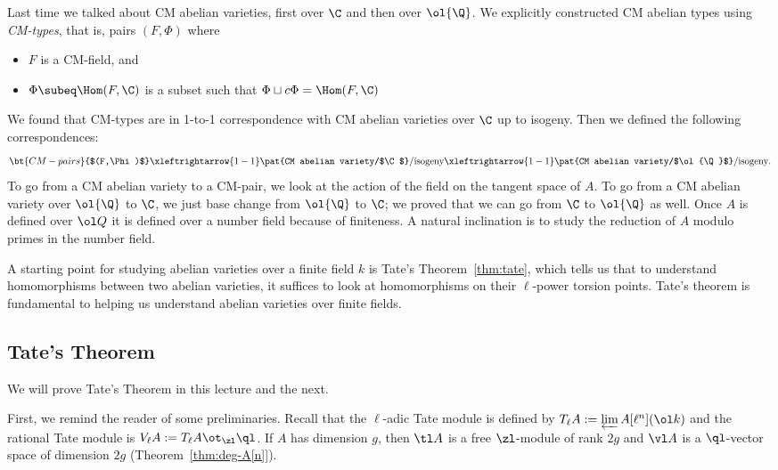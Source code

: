 
Last time we talked about CM abelian varieties, first over $\C$ and then over $\ol{\Q}$. We explicitly constructed CM abelian types using {\it CM-types}, that is, pairs $(F,\Phi)$ where
\begin{itemize}
\item
$F$ is a CM-field, and
\item
$\Phi\subeq \Hom(F,\C)$ is a subset such that $\Phi\sqcup c\Phi=\Hom(F,\C)$
\end{itemize}
We found that CM-types are in 1-to-1 correspondence with CM abelian varieties over $\C$ up to isogeny.
Then we defined the following correspondences: %
\[
\bt{CM-pairs}{$(F,\Phi)$}
\xleftrightarrow{1-1} 
\pat{CM abelian variety/$\C$}/\text{isogeny} \xleftrightarrow{1-1}
\pat{CM abelian variety/$\ol{\Q}$}/\text{isogeny}.
\]
To go from a CM abelian variety to a CM-pair, we look at the action of the field on the tangent space of $A$.
To go from a CM abelian variety over $\ol{\Q}$ to $\C$, we just base change from $\ol{\Q}$ to $\C$; we proved that we can go from $\C$ to $\ol{\Q}$ as well. Once $A$ is defined over $\ol Q$ it is defined over a number field because of finiteness. %
A natural inclination is to study the reduction of $A$ modulo primes in the number field.

A starting point for studying abelian varieties over a finite field $k$ is Tate's Theorem~\ref{thm:tate}, which tells us that to understand homomorphisms between two abelian varieties, it suffices to look at homomorphisms on their $\ell$-power torsion points. Tate's theorem is fundamental to helping us understand abelian varieties over finite fields.

\subsection{Tate's Theorem}
We will prove Tate's Theorem in this lecture and the next.

First, we remind the reader of some preliminaries. Recall that the $\ell$-adic Tate module is defined by $T_{\ell}A:=\varprojlim A[\ell^n] (\ol k)$ and the rational Tate module is $V_{\ell}A:=T_{\ell}A\ot_{\zl}\ql$. If $A$ has dimension $g$, then $\tl A$ is a free $\zl$-module of rank $2g$ and $\vl A$ is a $\ql$-vector space of dimension $2g$  (Theorem~\ref{thm:deg-A[n]}).

